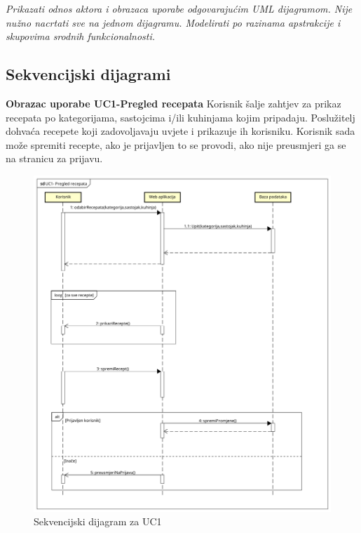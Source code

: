 					\textit{Prikazati odnos aktora i obrazaca uporabe odgovarajućim UML dijagramom. Nije nužno nacrtati sve na jednom dijagramu. Modelirati po razinama apstrakcije i skupovima srodnih funkcionalnosti.}
				\eject		
				
			\subsection{Sekvencijski dijagrami}
				
				\noindent
				\textbf{Obrazac uporabe UC1-Pregled recepata}\newline
					{Korisnik šalje zahtjev za prikaz recepata po kategorijama, sastojcima i/ili kuhinjama kojim pripadaju. Poslužitelj dohvaća recepete koji zadovoljavaju uvjete i prikazuje ih korisniku. Korisnik sada može spremiti recepte, ako je prijavljen to se provodi, ako nije preusmjeri ga se na stranicu za prijavu.}
				
				
				\begin{figure}[H]
					\includegraphics[scale= 0.4]{slike/sekvencijski_dijagramUC1.png}
					\centering
					\caption{Sekvencijski dijagram za UC1}
					\label{fig:Sekvencijski dijagram za UC1}
				\end{figure} 
				\eject

